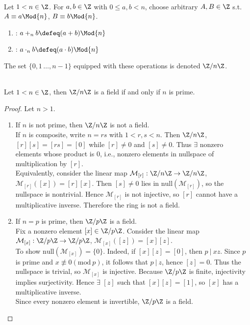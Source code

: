 \begin{definition} \\
Let $1 < n \in \Z$. For $a,b \in \Z$ with $0 \leq a, b < n$, choose arbitrary $A,B \in \Z$ s.t. $A \equiv a \Mod{n}$, $B \equiv b \Mod{n}$.
\begin{enumerate}[label=\roman*.]
\setlength{\itemsep}{0pt}
\item {}: $a +_{n} b \defeq (a+b) \Mod{n}$
\item {}: $a \cdot_{n} b \defeq (a \cdot b) \Mod{n}$
\end{enumerate}
The set $\{0, 1\, \ldots, n-1 \}$ equipped with these operations is denoted $\Z / n \Z$.
\end{definition}

\begin{theorem} \label{thm:primefieldthmforfinitefields} \\
Let $1 < n \in \Z$, then $\Z / n \Z$ is a field if and only if $n$ is prime.
\begin{proof} Let $n > 1$.
\begin{enumerate}[label=\roman*.]
\setlength{\itemsep}{0pt}
\item[$(\Rightarrow)$] If $n$ is not prime, then $\Z / n \Z$ is not a field.\\
If $n$ is composite, write $n = rs$ with $1 < r, s < n$. Then $\Z / n \Z$, $[r][s] = [rs] = [0]$ while $[r] \neq 0$ and $[s] \neq 0$. Thus $\exists$ nonzero elements whose product is $0$, i.e., nonzero elements in nullspace of multiplication by $[r]$.\\
Equivalently, consider the linear map $\mathcal{M}_{[r]}: \Z / n \Z \rightarrow \Z / n \Z$, $\mathcal{M}_{[r]}([x]) = [r][x]$. Then $[s] \neq 0$ lies in $\text{null}(\mathcal{M}_{[r]})$, so the nullspace is nontrivial. Hence $\mathcal{M}_{[r]}$ is not injective, so $[r]$ cannot have a multiplicative inverse. Therefore the ring is not a field.
\item[$(\Leftarrow)$] If $n = p$ is prime, then $\Z / p \Z$ is a field.\\
Fix a nonzero element $[x] \in \Z / p \Z$. Consider the linear map $\mathcal{M}_{[x]}: \Z / p \Z \rightarrow \Z / p \Z$, $\mathcal{M}_{[x]}([z]) = [x][z]$.\\
To show $\text{null}(\mathcal{M}_{[x]}) = \{ 0 \}$. Indeed, if $[x][z] = [0]$, then $p \ \vert \ xz$. Since $p$ is prime and $x \not\equiv 0 (\text{mod} \ p)$, it follows that $p \ \vert \ z$, hence $[z] = 0$. Thus the nullspace is trivial, so $\mathcal{M}_{[x]}$ is injective. Because $\Z / p \Z$ is finite, injectivity implies surjectivity. Hence $\exists$ $[z]$ such that $[x][z] = [1]$, so $[x]$ has a multiplicative inverse.\\
Since every nonzero element is invertible, $\Z / p \Z$ is a field.
\end{enumerate}
\end{proof}
\end{theorem}

